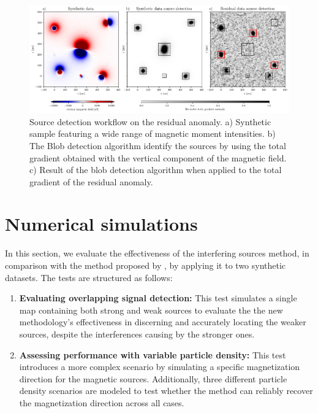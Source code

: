     \begin{figure}[tb!]
      \centering
      \includegraphics[width=1\linewidth]{paper/figures/re-detection-methodology.png}
      \caption{Source detection workflow on the residual anomaly. a) Synthetic sample featuring a wide range of magnetic moment intensities. b) The Blob detection algorithm identify the sources by using the total gradient obtained with the vertical component of the magnetic field. c) Result of the blob detection algorithm when applied to the total gradient of the residual anomaly.}
      \label{method-redetection}
    \end{figure}

\section{Numerical simulations}

In this section, we evaluate the effectiveness of the interfering sources method, in comparison with the method proposed by \citet{Souza-Junior2024}, by applying it to two synthetic datasets. The tests are structured as follows:  

\begin{enumerate}
    \item \textbf{Evaluating overlapping signal detection:} This test simulates a single map containing both strong and weak sources to evaluate the the new methodology's effectiveness in discerning and accurately locating the weaker sources, despite the interferences causing by the stronger ones.
        
    \item \textbf{Assessing performance with variable particle density:} This test introduces a more complex scenario by simulating a specific magnetization direction for the magnetic sources. Additionally, three different particle density scenarios are modeled to test whether the method can reliably recover the magnetization direction across all cases.
        
\end{enumerate}

